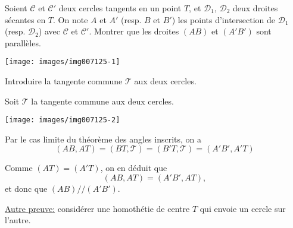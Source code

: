 \begin{exo} %
Soient $\mathcal C$ et $\mathcal C'$ deux cercles tangents en un point $T$, et $\mathcal D_1$, $\mathcal D_2$ deux droites sécantes en $T$. On note $A$ et $A'$ (resp. $B$ et $B'$) les points d'intersection de $\mathcal D_1$ (resp. $\mathcal D_2$) avec $\mathcal C$ et $\mathcal C'$. Montrer que les droites $(AB)$ et $(A'B')$ sont parallèles.


\begin{center}
\texttt{[image: images/img007125-1]}
\end{center}


\begin{hint}
Introduire la tangente commune $\mathcal T$ aux deux cercles. 
\end{hint}
\begin{sol}
Soit $\mathcal T$ la tangente commune  aux deux cercles.

\begin{center}
\texttt{[image: images/img007125-2]}
\end{center}

Par le cas limite du théorème des angles inscrits, on a 
\[ (AB,AT) = (BT,\mathcal T)=(B'T,\mathcal T)=(A'B',A'T)\]

Comme $(AT) = (A'T)$, on en déduit que
\[ (AB,AT) = (A'B',AT),\]
et donc que $(AB)//(A'B')$. 

\underline{Autre preuve:} considérer une homothétie de centre $T$ qui envoie un cercle sur l'autre.

\end{sol}
\end{exo}



